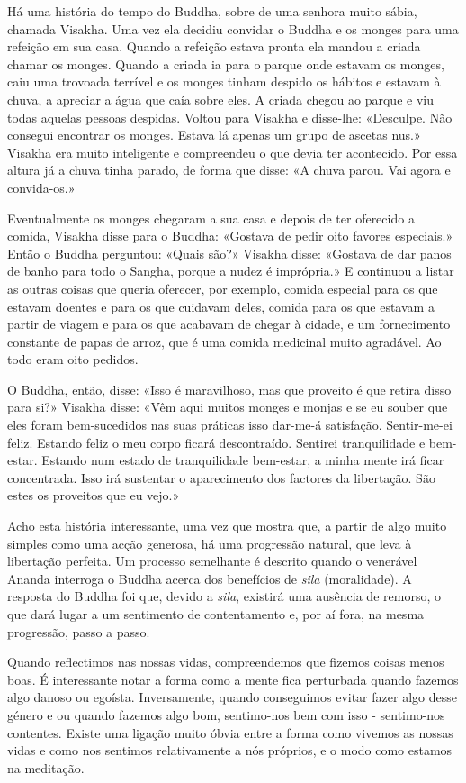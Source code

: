 Há uma história do tempo do Buddha, sobre de uma senhora muito sábia,
chamada Visakha. Uma vez ela decidiu convidar o Buddha e os monges para
uma refeição em sua casa. Quando a refeição estava pronta ela mandou a
criada chamar os monges. Quando a criada ia para o parque onde estavam
os monges, caiu uma trovoada terrível e os monges tinham despido os
hábitos e estavam à chuva, a apreciar a água que caía sobre eles. A
criada chegou ao parque e viu todas aquelas pessoas despidas. Voltou
para Visakha e disse-lhe: «Desculpe. Não consegui encontrar os monges.
Estava lá apenas um grupo de ascetas nus.» Visakha era muito inteligente
e compreendeu o que devia ter acontecido. Por essa altura já a chuva
tinha parado, de forma que disse: «A chuva parou. Vai agora e
convida-os.»

Eventualmente os monges chegaram a sua casa e depois de ter oferecido a
comida, Visakha disse para o Buddha: «Gostava de pedir oito favores
especiais.» Então o Buddha perguntou: «Quais são?» Visakha disse:
«Gostava de dar panos de banho para todo o Sangha, porque a nudez é
imprópria.» E continuou a listar as outras coisas que queria oferecer,
por exemplo, comida especial para os que estavam doentes e para os que
cuidavam deles, comida para os que estavam a partir de viagem e para os
que acabavam de chegar à cidade, e um fornecimento constante de papas de
arroz, que é uma comida medicinal muito agradável. Ao todo eram oito
pedidos.

O Buddha, então, disse: «Isso é maravilhoso, mas que proveito é que
retira disso para si?» Visakha disse: «Vêm aqui muitos monges e monjas e
se eu souber que eles foram bem-sucedidos nas suas práticas isso
dar-me-á satisfação. Sentir-me-ei feliz. Estando feliz o meu corpo
ficará descontraído. Sentirei tranquilidade e bem-estar. Estando num
estado de tranquilidade \mbox{bem-estar}, a minha mente irá ficar concentrada.
Isso irá sustentar o aparecimento dos factores da libertação. São estes
os proveitos que eu vejo.»

Acho esta história interessante, uma vez que mostra que, a partir de
algo muito simples como uma acção generosa, há uma progressão natural,
que leva à libertação perfeita. Um processo semelhante é descrito quando
o venerável Ananda interroga o Buddha acerca dos benefícios de
\emph{sila} (moralidade). A resposta do Buddha foi que, devido a
\emph{sila}, existirá uma ausência de remorso, o que dará lugar a um
sentimento de contentamento e, por aí fora, na mesma progressão, passo a
passo.

Quando reflectimos nas nossas vidas, compreendemos que fizemos coisas
menos boas. É interessante notar a forma como a mente fica perturbada
quando fazemos algo danoso ou egoísta. Inversamente, quando conseguimos
evitar fazer algo desse género e ou quando fazemos algo bom, sentimo-nos
bem com isso - sentimo-nos contentes. Existe uma ligação muito óbvia
entre a forma como vivemos as nossas vidas e como nos sentimos
relativamente a nós próprios, e o modo como estamos na meditação.

